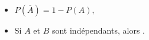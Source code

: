 \begin{fiche}
\begin{prop}
\begin{itemize}
			\item 
				$\displaystyle{P(\overline{A})} = 1 - P(A)$,
			\item Si $A$ et $B$ sont ind\'ependants, alors 
				.

\end{itemize}
\end{prop}
\end{fiche}
